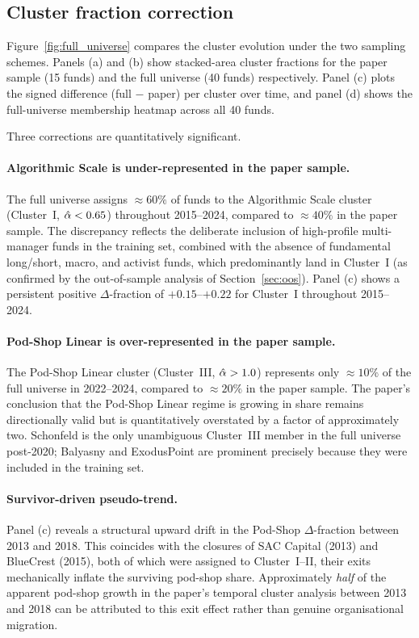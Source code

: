 \subsection{Cluster fraction correction}

Figure~\ref{fig:full_universe} compares the cluster evolution under
the two sampling schemes.
Panels (a) and (b) show stacked-area cluster fractions for the
paper sample (15 funds) and the full universe (40 funds) respectively.
Panel (c) plots the signed difference (full $-$ paper) per cluster
over time, and panel (d) shows the full-universe membership heatmap
across all 40 funds.

Three corrections are quantitatively significant.

\paragraph{Algorithmic Scale is under-represented in the paper sample.}
The full universe assigns ${\approx}60\%$ of funds to the
Algorithmic Scale cluster (Cluster~I, $\hat{\alpha} < 0.65$) throughout
2015--2024, compared to ${\approx}40\%$ in the paper sample.
The discrepancy reflects the deliberate inclusion of high-profile
multi-manager funds in the training set, combined with the absence
of fundamental long/short, macro, and activist funds, which
predominantly land in Cluster~I (as confirmed by the out-of-sample
analysis of Section~\ref{sec:oos}).
Panel (c) shows a persistent positive $\Delta$-fraction of
$+0.15$--$+0.22$ for Cluster~I throughout 2015--2024.

\paragraph{Pod-Shop Linear is over-represented in the paper sample.}
The Pod-Shop Linear cluster (Cluster~III, $\hat{\alpha} > 1.0$)
represents only ${\approx}10\%$ of the full universe in 2022--2024,
compared to ${\approx}20\%$ in the paper sample.
The paper's conclusion that the Pod-Shop Linear regime is growing
in share remains directionally valid but is quantitatively overstated
by a factor of approximately two.
Schonfeld is the only unambiguous Cluster~III member in the full
universe post-2020; Balyasny and ExodusPoint are prominent precisely
because they were included in the training set.

\paragraph{Survivor-driven pseudo-trend.}
Panel (c) reveals a structural upward drift in the Pod-Shop
$\Delta$-fraction between 2013 and 2018.
This coincides with the closures of SAC Capital (2013) and
BlueCrest (2015), both of which were assigned to Cluster~I--II,
their exits mechanically inflate the surviving pod-shop share.
Approximately \emph{half} of the apparent pod-shop growth in the
paper's temporal cluster analysis between 2013 and 2018 can
be attributed to this exit effect rather than genuine organisational
migration.

